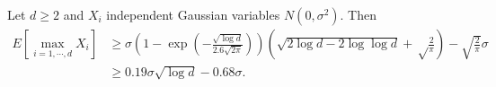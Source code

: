\documentclass{article} %
\begin{document}

\begin{theorem}
Let $d\geq2$ and $X_i$ independent Gaussian variables $N(0,\sigma^2)$. Then
\begin{align*}
E\left[\max_{i=1,\cdots,d} X_i\right] 
&\geq \sigma \left(1 - \exp\left(-\frac{\sqrt{\log d}}{2.6 \sqrt{2\pi}}\right)\right) \left(\sqrt{2 \log d-2\log \log d} +\sqrt\frac{2}{\pi}\right) -\sqrt{\frac{2}{\pi}} \sigma \\
&\geq 0.19 \sigma \sqrt{\log d} - 0.68 \sigma.
\end{align*}
\end{theorem}
\end{document}
